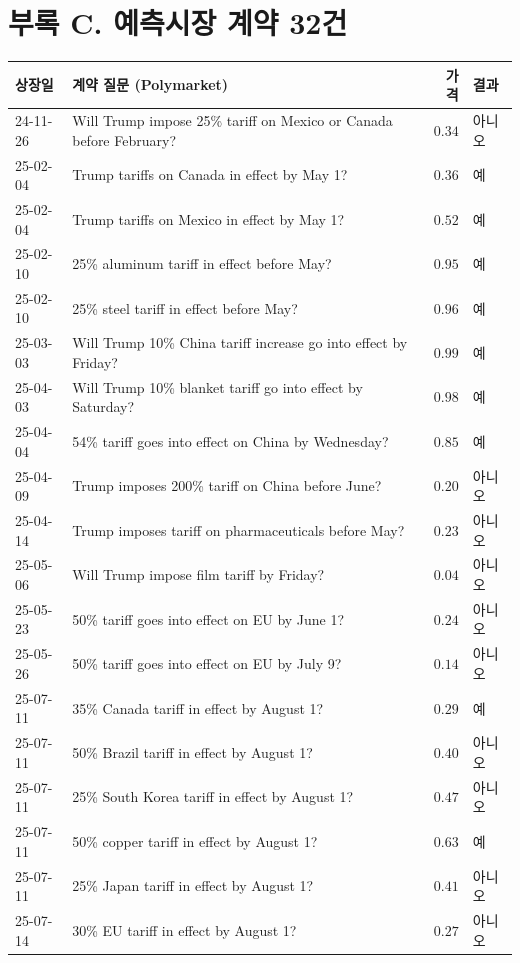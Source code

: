 \documentclass[11pt,a4paper]{article}
\begin{document}
\section*{부록 C. 예측시장 계약 32건}
\begingroup\scriptsize\linespread{1.05}\selectfont
\begin{tabularx}{\textwidth}{@{}lYrl@{}}
\toprule
상장일 & 계약 질문 (Polymarket) & 가격 & 결과\\
-11-26 & Will Trump impose 25\% tariff on Mexico or Canada before February? & $0.34$ & 아니오\\
25-02-04 & Trump tariffs on Canada in effect by May 1? & $0.36$ & 예\\
25-02-04 & Trump tariffs on Mexico in effect by May 1? & $0.52$ & 예\\
25-02-10 & 25\% aluminum tariff in effect before May? & $0.95$ & 예\\
25-02-10 & 25\% steel tariff in effect before May? & $0.96$ & 예\\
25-03-03 & Will Trump 10\% China tariff increase go into effect by Friday? & $0.99$ & 예\\
25-04-03 & Will Trump 10\% blanket tariff go into effect by Saturday? & $0.98$ & 예\\
25-04-04 & 54\% tariff goes into effect on China by Wednesday? & $0.85$ & 예\\
25-04-09 & Trump imposes 200\% tariff on China before June? & $0.20$ & 아니오\\
25-04-14 & Trump imposes tariff on pharmaceuticals before May? & $0.23$ & 아니오\\
25-05-06 & Will Trump impose film tariff by Friday? & $0.04$ & 아니오\\
25-05-23 & 50\% tariff goes into effect on EU by June 1? & $0.24$ & 아니오\\
25-05-26 & 50\% tariff goes into effect on EU by July 9? & $0.14$ & 아니오\\
25-07-11 & 35\% Canada tariff in effect by August 1? & $0.29$ & 예\\
25-07-11 & 50\% Brazil tariff in effect by August 1? & $0.40$ & 아니오\\
25-07-11 & 25\% South Korea tariff in effect by August 1? & $0.47$ & 아니오\\
25-07-11 & 50\% copper tariff in effect by August 1? & $0.63$ & 예\\
25-07-11 & 25\% Japan tariff in effect by August 1? & $0.41$ & 아니오\\
25-07-14 & 30\% EU tariff in effect by August 1? & $0.27$ & 아니오\\

\end{tabularx}
\end{document}
